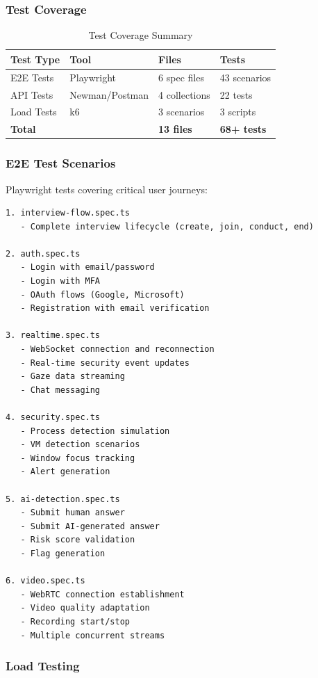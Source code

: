 \documentclass[11pt,letterpaper]{article}
\begin{document}
\subsubsection{Test Coverage}

\begin{table}[H]
\centering
\begin{tabularx}{\textwidth}{lXll}
\toprule
\textbf{Test Type} & \textbf{Tool} & \textbf{Files} & \textbf{Tests} \\
\midrule
E2E Tests & Playwright & 6 spec files & 43 scenarios \\
API Tests & Newman/Postman & 4 collections & 22 tests \\
Load Tests & k6 & 3 scenarios & 3 scripts \\
\textbf{Total} & & \textbf{13 files} & \textbf{68+ tests} \\
\bottomrule
\end{tabularx}
\caption{Test Coverage Summary}
\end{table}

\subsubsection{E2E Test Scenarios}

Playwright tests covering critical user journeys:

\begin{lstlisting}[caption=E2E Test Categories]
1. interview-flow.spec.ts
   - Complete interview lifecycle (create, join, conduct, end)

2. auth.spec.ts
   - Login with email/password
   - Login with MFA
   - OAuth flows (Google, Microsoft)
   - Registration with email verification

3. realtime.spec.ts
   - WebSocket connection and reconnection
   - Real-time security event updates
   - Gaze data streaming
   - Chat messaging

4. security.spec.ts
   - Process detection simulation
   - VM detection scenarios
   - Window focus tracking
   - Alert generation

5. ai-detection.spec.ts
   - Submit human answer
   - Submit AI-generated answer
   - Risk score validation
   - Flag generation

6. video.spec.ts
   - WebRTC connection establishment
   - Video quality adaptation
   - Recording start/stop
   - Multiple concurrent streams
\end{lstlisting}

\subsubsection{Load Testing}
\end{document}
